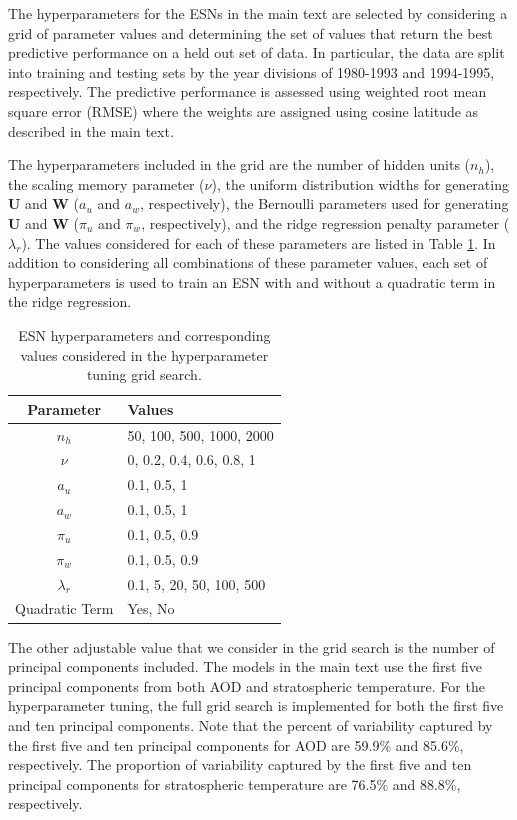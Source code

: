 \documentclass[AMS,STIX2COL]{WileyNJD-v2}
\begin{document}
The hyperparameters for the ESNs in the main text are selected by considering a grid of parameter values and determining the set of values that return the best predictive performance on a held out set of data. In particular, the data are split into training and testing sets by the year divisions of 1980-1993 and 1994-1995, respectively. The predictive performance is assessed using weighted root mean square error (RMSE) where the weights are assigned using cosine latitude as described in the main text.

The hyperparameters included in the grid are the number of hidden units ($n_h$), the scaling memory parameter ($\nu$), the uniform distribution widths for generating $\textbf{U}$ and $\textbf{W}$ ($a_u$ and $a_w$, respectively), the Bernoulli parameters used for generating $\textbf{U}$ and $\textbf{W}$ ($\pi_u$ and $\pi_w$, respectively), and the ridge regression penalty parameter ($\lambda_r$). The values considered for each of these parameters are listed in Table \ref{tab:hps}. In addition to considering all combinations of these parameter values, each set of hyperparameters is used to train an ESN with and without a quadratic term in the ridge regression.

\begin{table}[]
    \centering
    \begin{tabular}{cl}
    \hline
    Parameter & Values \\
    \hline
    $n_h$ & 50, 100, 500, 1000, 2000\\
    $\nu$ & 0, 0.2, 0.4, 0.6, 0.8, 1\\
    $a_u$ & 0.1, 0.5, 1\\
    $a_w$ & 0.1, 0.5, 1\\
    $\pi_u$ & 0.1, 0.5, 0.9\\
    $\pi_w$ & 0.1, 0.5, 0.9\\
    $\lambda_r$ & 0.1, 5, 20, 50, 100, 500\\
    Quadratic Term & Yes, No\\
    \hline
    \end{tabular}
    \caption{ESN hyperparameters and corresponding values considered in the hyperparameter tuning grid search.}
    \label{tab:hps}
\end{table}

The other adjustable value that we consider in the grid search is the number of principal components included. The models in the main text use the first five principal components from both AOD and stratospheric temperature. For the hyperparameter tuning, the full grid search is implemented for both the first five and ten principal components. Note that the percent of variability captured by the first five and ten principal components for AOD are 59.9\% and 85.6\%, respectively. The proportion of variability captured by the first five and ten principal components for stratospheric temperature are 76.5\% and 88.8\%, respectively.
\end{document}
